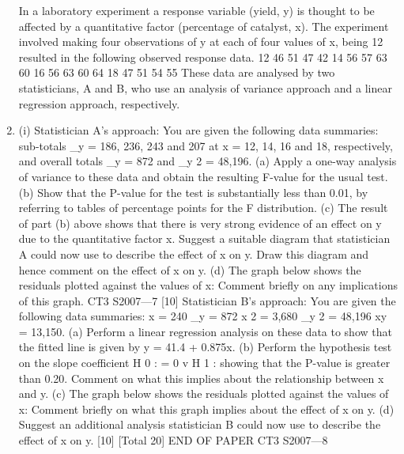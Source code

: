 \documentclass[a4paper,12pt]{article}
\begin{document}
\begin{enumerate}

In a laboratory experiment a response variable (yield, y) is thought to be affected by a
quantitative factor (percentage of catalyst, x). The experiment involved making four
observations of y at each of four values of x, being 12%
resulted in the following observed response data.
12%
46
51
47
42
14%
56
57
63
60
16%
56
63
60
64
18%
47
51
54
55
These data are analysed by two statisticians, A and B, who use an analysis of variance
approach and a linear regression approach, respectively.
\item (i)
Statistician A’s approach:
You are given the following data summaries:
sub-totals \sum_y = 186, 236, 243 and 207 at x = 12, 14, 16 and 18,
respectively, and overall totals \sum_y = 872 and \sum_y 2 = 48,196.
(a) Apply a one-way analysis of variance to these data and obtain the
resulting F-value for the usual test.
(b) Show that the P-value for the test is substantially less than 0.01, by
referring to tables of percentage points for the F distribution.
(c) The result of part (b) above shows that there is very strong evidence of
an effect on y due to the quantitative factor x. Suggest a suitable
diagram that statistician A could now use to describe the effect of x on
y. Draw this diagram and hence comment on the effect of x on y.
(d) The graph below shows the residuals plotted against the values of x:
Comment briefly on any implications of this graph.
CT3 S2007—7
[10]
Statistician B’s approach:
You are given the following data summaries:
\sum x = 240 \sum_y = 872 \sum x 2 = 3,680 \sum_y 2 = 48,196 \sum xy = 13,150.
(a) Perform a linear regression analysis on these data to show that the
fitted line is given by y = 41.4 + 0.875x.
(b) Perform the hypothesis test on the slope coefficient
H 0 : \beta = 0 v H 1 : \beta {}
showing that the P-value is greater than 0.20.
Comment on what this implies about the relationship between x and y.
(c)
The graph below shows the residuals plotted against the values of x:
Comment briefly on what this graph implies about the effect of x on y.
(d)
Suggest an additional analysis statistician B could now use to describe
the effect of x on y.
[10]
[Total 20]
END OF PAPER
CT3 S2007—8



\end{enumerate}
\end{document}
